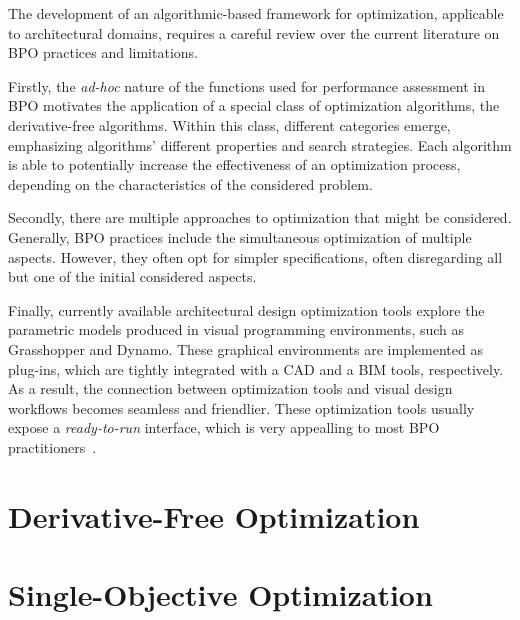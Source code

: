 \cleardoublepage
\label{chap:back}

	The development of an algorithmic-based framework for optimization, applicable to architectural domains, requires a careful review over the current literature on \ac{BPO} practices and limitations. 
	
	Firstly, the \textit{ad-hoc} nature of the functions used for performance assessment in \ac{BPO} motivates the application of a special class of optimization algorithms, the derivative-free algorithms. Within this class, different categories emerge, emphasizing algorithms' different properties and search strategies. Each algorithm is able to potentially increase the effectiveness of an optimization process, depending on the characteristics of the considered problem. 
	
	Secondly, there are multiple approaches to optimization that might be considered. Generally, \ac{BPO} practices include the simultaneous optimization of multiple aspects. However, they often opt for simpler  specifications, often disregarding all but one of the initial considered aspects. 

	Finally, currently available architectural design optimization tools explore the parametric models produced in visual programming environments, such as Grasshopper and Dynamo. These graphical environments are implemented as plug-ins, which are tightly integrated with a \ac{CAD} and a \ac{BIM} tools, respectively. As a result, the connection between optimization tools and visual design workflows becomes seamless and friendlier. These optimization tools usually expose a \textit{ready-to-run} interface, which is very appealling to most \ac{BPO} practitioners~\cite{Cichocka2017SURVEY}.
	
\section{Derivative-Free Optimization}


\section{Single-Objective Optimization}


